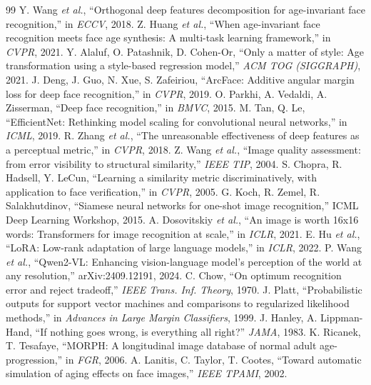 \documentclass[10pt,twocolumn]{article}
\begin{document}
\begin{thebibliography}{99}\small
{} Y. Wang \emph{et al.}, ``Orthogonal deep features decomposition for age-invariant face recognition,'' in \emph{ECCV}, 2018.
 Z. Huang \emph{et al.}, ``When age-invariant face recognition meets face age synthesis: A multi-task learning framework,'' in \emph{CVPR}, 2021.
 Y. Alaluf, O. Patashnik, D. Cohen-Or, ``Only a matter of style: Age transformation using a style-based regression model,'' \emph{ACM TOG (SIGGRAPH)}, 2021.
 J. Deng, J. Guo, N. Xue, S. Zafeiriou, ``ArcFace: Additive angular margin loss for deep face recognition,'' in \emph{CVPR}, 2019.
 O. Parkhi, A. Vedaldi, A. Zisserman, ``Deep face recognition,'' in \emph{BMVC}, 2015.
 M. Tan, Q. Le, ``EfficientNet: Rethinking model scaling for convolutional neural networks,'' in \emph{ICML}, 2019.
 R. Zhang \emph{et al.}, ``The unreasonable effectiveness of deep features as a perceptual metric,'' in \emph{CVPR}, 2018.
 Z. Wang \emph{et al.}, ``Image quality assessment: from error visibility to structural similarity,'' \emph{IEEE TIP}, 2004.
 S. Chopra, R. Hadsell, Y. LeCun, ``Learning a similarity metric discriminatively, with application to face verification,'' in \emph{CVPR}, 2005.
 G. Koch, R. Zemel, R. Salakhutdinov, ``Siamese neural networks for one-shot image recognition,'' ICML Deep Learning Workshop, 2015.
 A. Dosovitskiy \emph{et al.}, ``An image is worth 16x16 words: Transformers for image recognition at scale,'' in \emph{ICLR}, 2021.
 E. Hu \emph{et al.}, ``LoRA: Low-rank adaptation of large language models,'' in \emph{ICLR}, 2022.
 P. Wang \emph{et al.}, ``Qwen2-VL: Enhancing vision-language model's perception of the world at any resolution,'' arXiv:2409.12191, 2024.
 C. Chow, ``On optimum recognition error and reject tradeoff,'' \emph{IEEE Trans. Inf. Theory}, 1970.
 J. Platt, ``Probabilistic outputs for support vector machines and comparisons to regularized likelihood methods,'' in \emph{Advances in Large Margin Classifiers}, 1999.
 J. Hanley, A. Lippman-Hand, ``If nothing goes wrong, is everything all right?'' \emph{JAMA}, 1983.
 K. Ricanek, T. Tesafaye, ``MORPH: A longitudinal image database of normal adult age-progression,'' in \emph{FGR}, 2006.
 A. Lanitis, C. Taylor, T. Cootes, ``Toward automatic simulation of aging effects on face images,'' \emph{IEEE TPAMI}, 2002.
\end{thebibliography}
\end{document}
